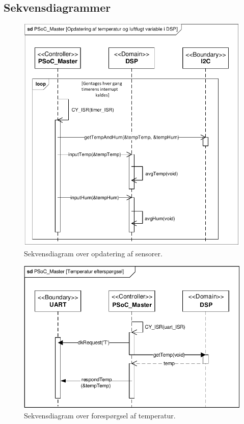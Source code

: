 \clearpage

\subsection{Sekvensdiagrammer}


\begin{figure}[h]
\centering
\includegraphics[scale=1]{../fig/sd_PSoC_master_update_sensor_values}
\caption{Sekvensdiagram over opdatering af sensorer.}
\label{fig:sd_PSoC_master_sensor}
\end{figure}

\begin{figure}[h]
\centering
\includegraphics[scale=1]{../fig/sd_PSoC_master_tempreq}
\caption{Sekvensdiagram over forespørgsel af temperatur.}
\label{fig:sd_PSoC_master_tempreq}
\end{figure}

